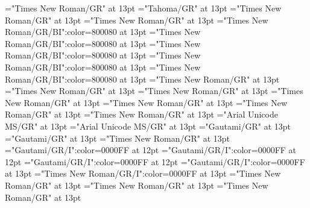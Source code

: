 \documentclass[a4paper]{article}
\begin{document}
\font\spanenpronunciationggofonipaxemicspanentryletDatadicBody="Times New Roman/GR" at 13pt
\font\spanggofonipaxemicpronunciationggofonipaxemicspanentryletDatadicBody="Tahoma/GR" at 13pt
\font\spanenspanentryletDatadicBody="Times New Roman/GR" at 13pt
\font\sensespanentryletDatadicBody="Times New Roman/GR" at 13pt
\font\grammaticalinfosensespanentryletDatadicBody="Times New Roman/GR/BI":color=800080 at 13pt
\font\grammaticalinfoaftersensespanentryletDatadicBody="Times New Roman/GR/BI":color=800080 at 13pt
\font\partofspeechengrammaticalinfosensespanentryletDatadicBody="Times New Roman/GR/BI":color=800080 at 13pt
\font\spanenpartofspeechengrammaticalinfosensespanentryletDatadicBody="Times New Roman/GR/BI":color=800080 at 13pt
\font\spanengrammaticalinfosensespanentryletDatadicBody="Times New Roman/GR/BI":color=800080 at 13pt
\font{}="Times New Roman/GR" at 13pt
\font\spanendefinitionensensespanentryletDatadicBody="Times New Roman/GR" at 13pt
\font\LexSensepublishStemDefinitionPubensensespanentryletDatadicBody="Times New Roman/GR" at 13pt
\font\spanenLexSensepublishStemDefinitionPubensensespanentryletDatadicBody="Times New Roman/GR" at 13pt
\font\LexSensepublishStemGlossPubLcensensespanentryletDatadicBody="Times New Roman/GR" at 13pt
\font\xitemenLexSensepublishStemGlossPubLcensensespanentryletDatadicBody="Times New Roman/GR" at 13pt
\font\spanenxitemenLexSensepublishStemGlossPubLcensensespanentryletDatadicBody="Times New Roman/GR" at 13pt
\font\xitemhiLexSensepublishStemGlossPubLcensensespanentryletDatadicBody="Arial Unicode MS/GR" at 13pt
\font\spanhixitemhiLexSensepublishStemGlossPubLcensensespanentryletDatadicBody="Arial Unicode MS/GR" at 13pt
\font\xitemteLexSensepublishStemGlossPubLcensensespanentryletDatadicBody="Gautami/GR" at 13pt
\font\spantexitemteLexSensepublishStemGlossPubLcensensespanentryletDatadicBody="Gautami/GR" at 13pt
\font\spansensespanentryletDatadicBody="Times New Roman/GR" at 13pt
\font\exampleggoTeluINspansensespanentryletDatadicBody="Gautami/GR/I":color=0000FF at 12pt
\font\examplebeforespansensespanentryletDatadicBody="Gautami/GR/I":color=0000FF at 12pt
\font\exampleafterspansensespanentryletDatadicBody="Gautami/GR/I":color=0000FF at 12pt
\font\spanggoTeluINexampleggoTeluINspansensespanentryletDatadicBody="Gautami/GR/I":color=0000FF at 13pt
\font\spanenexampleggoTeluINspansensespanentryletDatadicBody="Times New Roman/GR/I":color=0000FF at 13pt
\font\spanspansensespanentryletDatadicBody="Times New Roman/GR" at 13pt
\font\spanspanspansensespanentryletDatadicBody="Times New Roman/GR" at 13pt
\font\CmPossibilitypublishStemTransTypeAbbreviationPubenspanspanspansensespanentryletDatadicBody="Times New Roman/GR" at 13pt
\end{document}
